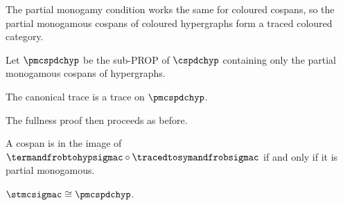 The partial monogamy condition works the same for coloured cospans, so
the partial monogamous cospans of coloured hypergraphs form a traced coloured
category.

\begin{definition}
    Let \(\pmcspdchyp\) be the sub-PROP of \(\cspdchyp\) containing only the
    partial monogamous cospans of hypergraphs.
\end{definition}

\begin{theorem}
    The canonical trace is a trace on \(\pmcspdchyp\).
\end{theorem}

The fullness proof then proceeds as before.

\begin{theorem}
    A cospan is in the image of
    \(\termandfrobtohypsigmac \circ \tracedtosymandfrobsigmac\) if and only if
    it is partial monogamous.
\end{theorem}

\begin{corollary}
    \(\stmcsigmac \cong \pmcspdchyp\).
\end{corollary}